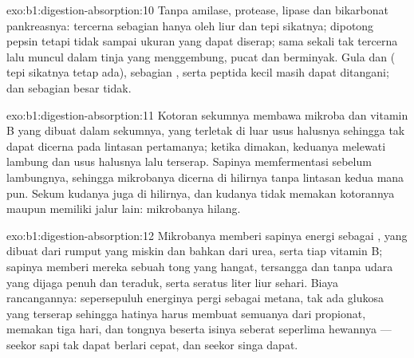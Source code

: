 \begin{solution}{exo:b1:digestion-absorption:10}
Tanpa amilase, protease, lipase dan bikarbonat pankreasnya: 
tercerna sebagian hanya oleh liur dan tepi sikatnya; 
dipotong pepsin tetapi tidak sampai ukuran yang dapat diserap;
 sama sekali tak tercerna lalu muncul dalam tinja yang
menggembung, pucat dan berminyak. Gula dan  ( tepi
sikatnya tetap ada), sebagian , serta peptida kecil masih dapat
ditangani;  dan sebagian besar  tidak.
\end{solution}

\begin{solution}{exo:b1:digestion-absorption:11}
Kotoran sekumnya membawa  mikroba dan vitamin B yang dibuat
dalam sekumnya, yang terletak di luar usus halusnya sehingga tak dapat
dicerna pada lintasan pertamanya; ketika dimakan, keduanya melewati
lambung dan usus halusnya lalu terserap. Sapinya memfermentasi sebelum
lambungnya, sehingga mikrobanya dicerna di hilirnya tanpa lintasan
kedua mana pun. Sekum kudanya juga di hilirnya, dan kudanya tidak
memakan kotorannya maupun memiliki jalur lain:  mikrobanya
hilang.
\end{solution}

\begin{solution}{exo:b1:digestion-absorption:12}
Mikrobanya memberi sapinya energi  sebagai , 
yang dibuat dari rumput yang miskin dan bahkan dari urea, serta tiap
vitamin B; sapinya memberi mereka sebuah tong yang hangat, tersangga
dan tanpa udara yang dijaga penuh dan teraduk, serta seratus liter
liur sehari. Biaya rancangannya: sepersepuluh energinya pergi sebagai
metana, tak ada glukosa yang terserap sehingga hatinya harus membuat
semuanya dari propionat,  memakan tiga hari, dan tongnya
beserta isinya seberat seperlima hewannya --- seekor sapi tak dapat
berlari cepat, dan seekor singa dapat.
\end{solution}

